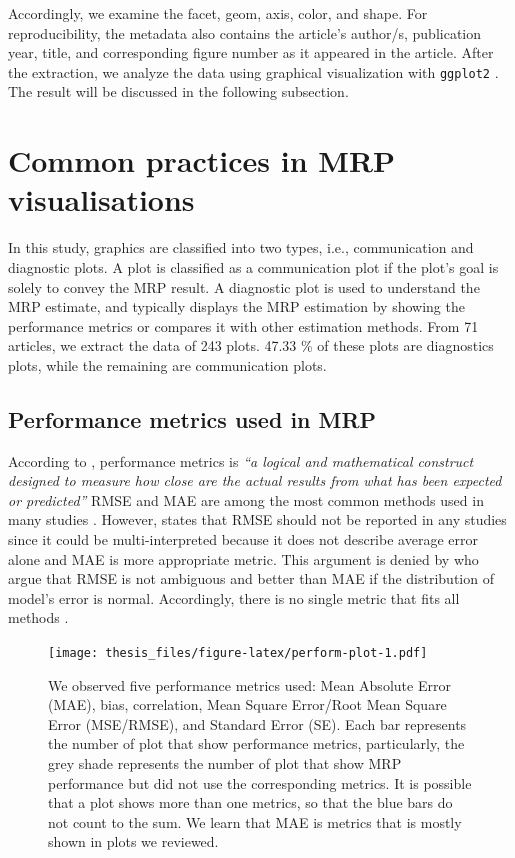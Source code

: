 \documentclass{monashthesis}
\begin{document}
Accordingly, we examine the facet, geom, axis, color, and shape. For reproducibility, the metadata also contains the article's author/s, publication year, title, and corresponding figure number as it appeared in the article. After the extraction, we analyze the data using graphical visualization with \texttt{ggplot2} \autocite{ggplot2}. The result will be discussed in the following subsection.

\hypertarget{com-prac}{%
\section{Common practices in MRP visualisations}\label{com-prac}}

In this study, graphics are classified into two types, i.e., communication and diagnostic plots. A plot is classified as a communication plot if the plot's goal is solely to convey the MRP result. A diagnostic plot is used to understand the MRP estimate, and typically displays the MRP estimation by showing the performance metrics or compares it with other estimation methods. From 71 articles, we extract the data of 243 plots. 47.33 \% of these plots are diagnostics plots, while the remaining are communication plots.

\hypertarget{performance-metrics-used-in-mrp}{%
\subsection{Performance metrics used in MRP}\label{performance-metrics-used-in-mrp}}

According to \textcite{BotchkarevAlexei2019ANTD}, performance metrics is \emph{``a logical and mathematical construct designed to measure how close are the actual results from what has been expected or predicted''} RMSE and MAE are among the most common methods used in many studies \autocite{BotchkarevAlexei2019ANTD}. However, \textcite{WillmottCJ2005Aotm} states that RMSE should not be reported in any studies since it could be multi-interpreted because it does not describe average error alone and MAE is more appropriate metric. This argument is denied by \textcite{ChaiT2014Rmse} who argue that RMSE is not ambiguous and better than MAE if the distribution of model's error is normal. Accordingly, there is no single metric that fits all methods \autocite{ChaiT2014Rmse}.

\begin{figure}
\centering
\texttt{[image: thesis\_files/figure-latex/perform-plot-1.pdf]}
\caption{\label{fig:perform-plot}We observed five performance metrics used: Mean Absolute Error (MAE), bias, correlation, Mean Square Error/Root Mean Square Error (MSE/RMSE), and Standard Error (SE). Each bar represents the number of plot that show performance metrics, particularly, the grey shade represents the number of plot that show MRP performance but did not use the corresponding metrics. It is possible that a plot shows more than one metrics, so that the blue bars do not count to the sum. We learn that MAE is metrics that is mostly shown in plots we reviewed.}
\end{figure}
\end{document}
